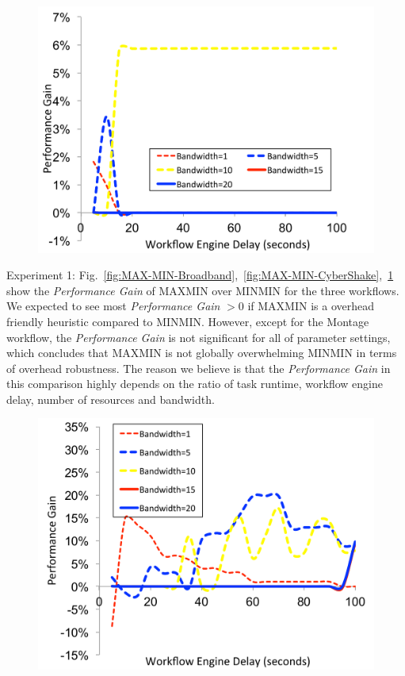 \documentclass[final]{IEEEtran}
\begin{document}
\begin{figure}[!htb]
\centering
 \includegraphics[width=0.9\linewidth]{figure/MAX-MIN-Montage.pdf}
  \label{fig:MAX-MIN-Montage}
  \vspace{-10pt}
\end{figure}


Experiment 1: Fig.~\ref{fig:MAX-MIN-Broadband},~\ref{fig:MAX-MIN-CyberShake},~\ref{fig:MAX-MIN-Montage} show the  \emph{Performance Gain} of MAXMIN over MINMIN for the three workflows. We expected to see most  \emph{Performance Gain} $>0$ if MAXMIN is a overhead friendly heuristic compared to MINMIN. However, except for the Montage workflow, the \emph{Performance Gain} is not significant for all of parameter settings, which concludes that MAXMIN is not globally overwhelming MINMIN in terms of overhead robustness. The reason we believe is that the  \emph{Performance Gain} in this comparison highly depends on the ratio of task runtime, workflow engine delay, number of resources and bandwidth. 

\begin{figure}[!htb]
\centering
 \includegraphics[width=0.9\linewidth]{figure/DFS-BFS-Broadband.pdf}
  \label{fig:DFS-BFS-Broadband}
  \vspace{-10pt}
\end{figure}
\end{document}
